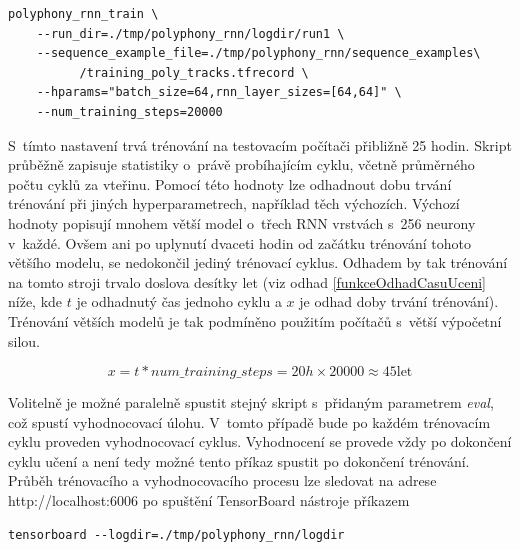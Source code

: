 \begin{verbatim}
polyphony_rnn_train \
    --run_dir=./tmp/polyphony_rnn/logdir/run1 \
    --sequence_example_file=./tmp/polyphony_rnn/sequence_examples\
          /training_poly_tracks.tfrecord \
    --hparams="batch_size=64,rnn_layer_sizes=[64,64]" \
    --num_training_steps=20000
\end{verbatim}
S~tímto nastavení trvá trénování na testovacím počítači přibližně 25 hodin.
Skript průběžně zapisuje statistiky o~právě probíhajícím cyklu, 
včetně průměrného počtu cyklů za vteřinu.
Pomocí této hodnoty lze odhadnout dobu trvání trénování při jiných hyperparametrech,
například těch výchozích.
Výchozí hodnoty popisují mnohem větší model o~třech RNN vrstvách s~256 neurony v~každé.
Ovšem ani po uplynutí dvaceti hodin od začátku trénování tohoto většího modelu,
se nedokončil jediný trénovací cyklus.
Odhadem by tak trénování na tomto stroji trvalo doslova desítky let
(viz odhad \ref{funkceOdhadCasuUceni} níže, kde $t$ je odhadnutý čas jednoho cyklu 
a $x$ je odhad doby trvání trénování).
Trénování větších modelů je tak podmíněno použitím počítačů s~větší výpočetní silou.

\begin{equation}\label{funkceOdhadCasuUceni}
    x = t * num\_training\_steps = 20h \times 20 000 \approx 45\text{let}
\end{equation}

Volitelně je možné paralelně spustit stejný skript s~přidaným parametrem \emph{eval},
což spustí vyhodnocovací úlohu.
V~tomto případě bude po každém trénovacím cyklu proveden vyhodnocovací cyklus.
Vyhodnocení se provede vždy po dokončení cyklu učení 
a není tedy možné tento příkaz spustit po dokončení trénování.
\cite{google_git_polyphony}
Průběh trénovacího a vyhodnocovacího procesu lze sledovat na adrese
http://localhost:6006 po spuštění TensorBoard nástroje příkazem

\begin{verbatim}
tensorboard --logdir=./tmp/polyphony_rnn/logdir   
\end{verbatim}
\par

